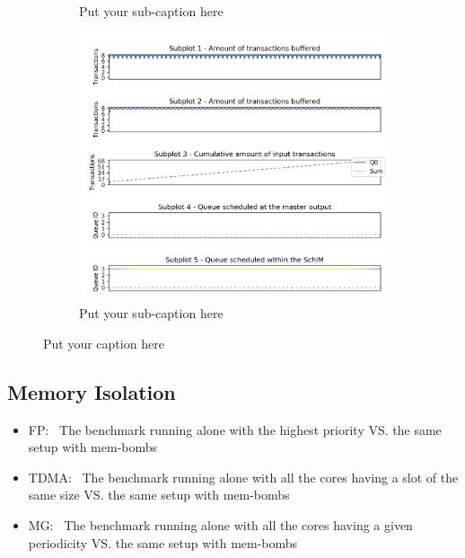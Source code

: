 \begin{figure}
\begin{subfigure}{.3\textwidth}
        \caption{Put your sub-caption here}
        \label{fig:schim_behaviour_tdma}
      \end{subfigure}
      \hfill
      \begin{subfigure}{.3\textwidth}
        \centering
        \includegraphics[scale=0.31]{../doc/experiments/buffering_4c_15_08_MG.png}  
        \caption{Put your sub-caption here}
        \label{fig:schim_behaviour_mg}
      \end{subfigure}
      \caption{Put your caption here}
      \label{fig:schim_behaviour}
    \end{figure}
    
  \subsection{Memory Isolation}
    \begin{itemize}
      \item FP:~ The benchmark running alone with the highest priority VS. the same setup with mem-bombs
      \item TDMA:~ The benchmark running alone with all the cores having a slot of the same size VS. the same setup with mem-bombs
      \item MG:~ The benchmark running alone with all the cores having a given periodicity VS. the same setup with mem-bombs
    \end{itemize}
